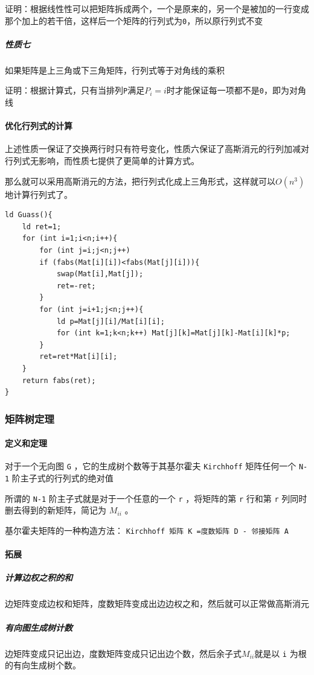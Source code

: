 \documentclass[UTF-8]{ctexart}
\begin{document}
	证明：根据线性性可以把矩阵拆成两个，一个是原来的，另一个是被加的一行变成那个加上的若干倍，这样后一个矩阵的行列式为\texttt{0}，所以原行列式不变
	
	\subparagraph{性质七} 如果矩阵是上三角或下三角矩阵，行列式等于对角线的乘积
	
	证明：根据计算式，只有当排列\texttt{P}满足$P _ i=i$时才能保证每一项都不是\texttt{0}，即为对角线
	
	\paragraph{优化行列式的计算} 上述性质一保证了交换两行时只有符号变化，性质六保证了高斯消元的行列加减对行列式无影响，而性质七提供了更简单的计算方式。
	
	那么就可以采用高斯消元的方法，把行列式化成上三角形式，这样就可以$O(n^3)$地计算行列式了。
\begin{verbatim}
ld Guass(){
    ld ret=1;
    for (int i=1;i<n;i++){
        for (int j=i;j<n;j++)
        if (fabs(Mat[i][i])<fabs(Mat[j][i])){
            swap(Mat[i],Mat[j]);
            ret=-ret;
        }
        for (int j=i+1;j<n;j++){
            ld p=Mat[j][i]/Mat[i][i];
            for (int k=1;k<n;k++) Mat[j][k]=Mat[j][k]-Mat[i][k]*p;
        }
        ret=ret*Mat[i][i];
    }
    return fabs(ret);
}
\end{verbatim}
	\subsubsection{矩阵树定理}
	\paragraph{定义和定理} 对于一个无向图 \texttt{G} ，它的生成树个数等于其基尔霍夫 \texttt{Kirchhoff} 矩阵任何一个 \texttt{N-1} 阶主子式的行列式的绝对值  
	
	所谓的 \texttt{N-1} 阶主子式就是对于一个任意的一个 \texttt{r} ，将矩阵的第 \texttt{r} 行和第 \texttt{r} 列同时删去得到的新矩阵，简记为 $M _ {ii}$ 。
	
	基尔霍夫矩阵的一种构造方法：  
	\texttt{Kirchhoff 矩阵 K =度数矩阵 D - 邻接矩阵 A}
	
	\paragraph{拓展}
	\subparagraph{计算边权之积的和} 边矩阵变成边权和矩阵，度数矩阵变成出边边权之和，然后就可以正常做高斯消元
	
	\subparagraph{有向图生成树计数} 边矩阵变成只记出边，度数矩阵变成只记出边个数，然后余子式$M _ {ii}$就是以 \texttt{i} 为根的有向生成树个数。
	
\end{document}
